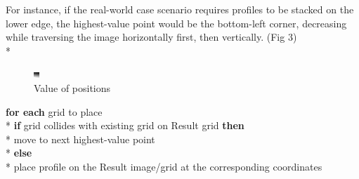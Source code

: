 \documentclass{article}
\begin{document}
	For instance, if the real-world case scenario requires profiles to be stacked on the lower edge, the highest-value point would be the bottom-left corner, decreasing while traversing the image horizontally first, then vertically. (Fig 3) \\*
	
	\begin{figure}[h]
		\centering
		\includegraphics[width=0.3\linewidth]{value}
		\caption{Value of positions}
		\label{fig:value}
	\end{figure}

	\begin{tabbing}
		\textbf{for each} grid to place \\*
		\kern 1pc \textbf{if} grid collides with existing grid on Result grid \textbf{then} \\*
		\kern 2pc move to next highest-value point \\*
		\kern 1pc \textbf{else} \\*
		\kern 2pc place profile on the Result image/grid at the corresponding coordinates
	\end{tabbing}
\end{document}
